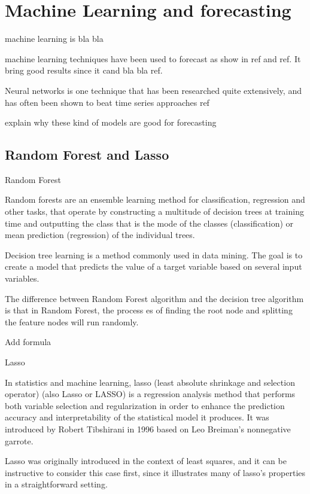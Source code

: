 \documentclass[12pt]{report}
\begin{document}
\section{Machine Learning and forecasting}

machine learning is bla bla

machine learning techniques have been used to forecast as show in ref and ref. It bring good results since
it cand bla bla ref.

Neural networks is one technique that has been researched quite 
extensively, and has often been shown to beat time series approaches ref 

explain why these kind of models are good for forecasting

\subsection{Random Forest and Lasso}

\begin{description}
 \item Random Forest
  
 Random forests  are an ensemble learning method for classification, 
 regression and other tasks, that operate by constructing a multitude of decision trees at training time 
 and outputting the class that is the mode of the classes (classification) or mean prediction (regression) 
 of the individual trees.
 
 Decision tree learning is a method commonly used in data mining. The goal is to create a model 
 that predicts the value of a target variable based on several input variables. 
 
 The difference between Random Forest algorithm and the decision tree algorithm is that in 
 Random Forest, the process es of finding the root node and splitting the feature nodes will run
 randomly.
 
 Add formula
 
 \item Lasso
 
 In statistics and machine learning, lasso (least absolute shrinkage and selection operator)
 (also Lasso or LASSO) is a regression analysis method that performs both variable selection and
 regularization in order to enhance the prediction accuracy and interpretability of the statistical
 model it produces. It was introduced by Robert Tibshirani in 1996 based on Leo Breiman’s
 nonnegative garrote.
 
 Lasso was originally introduced in the context of least squares, and it can be instructive to consider 
 this case first, since it illustrates many of lasso’s properties in a straightforward setting.
 
\end{description}
\end{document}
